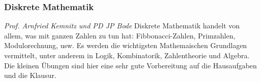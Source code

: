 \subsubsection{Diskrete Mathematik}
	\textit{Prof. Arnfried Kemnitz und PD JP Bode}
	Diskrete Mathematik handelt von allem, was mit ganzen Zahlen zu tun hat: Fibbonacci-Zahlen, Primzahlen, Modulorechnung, usw. Es werden die wichtigsten Mathemaischen Grundlagen vermittelt, unter anderem in Logik, Kombinatorik, Zahlentheorie und Algebra. Die kleinen Übungen sind hier eine sehr gute Vorbereitung auf die Hausaufgaben und die Klausur.